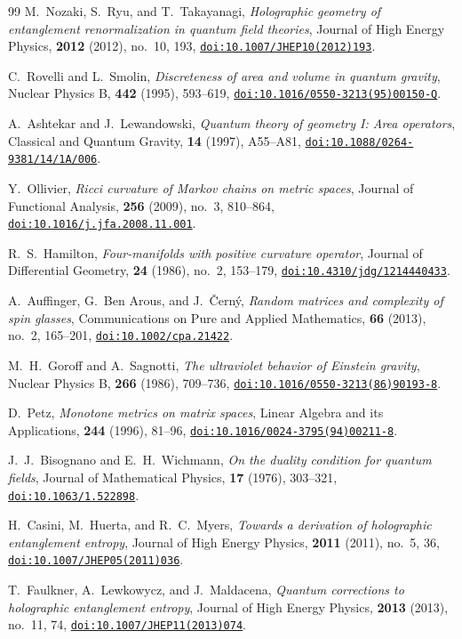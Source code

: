 \documentclass[11pt,a4paper,reqno]{amsart}
\theoremstyle{definition}
\numberwithin{equation}{section}
\providecommand{\doi}[1]{\href{https://doi.org/#1}{\nolinkurl{doi:#1}}}
\begin{document}
\begin{thebibliography}{99}
M.~Nozaki, S.~Ryu, and T.~Takayanagi,
\emph{Holographic geometry of entanglement renormalization in quantum field theories},
Journal of High Energy Physics, \textbf{2012} (2012), no.~10, 193,
\doi{10.1007/JHEP10(2012)193}.

C.~Rovelli and L.~Smolin,
\emph{Discreteness of area and volume in quantum gravity},
Nuclear Physics B, \textbf{442} (1995), 593--619,
\doi{10.1016/0550-3213(95)00150-Q}.

A.~Ashtekar and J.~Lewandowski,
\emph{Quantum theory of geometry I: Area operators},
Classical and Quantum Gravity, \textbf{14} (1997), A55--A81,
\doi{10.1088/0264-9381/14/1A/006}.

Y.~Ollivier,
\emph{Ricci curvature of Markov chains on metric spaces},
Journal of Functional Analysis, \textbf{256} (2009), no.~3, 810--864,
\doi{10.1016/j.jfa.2008.11.001}.

R.~S.~Hamilton,
\emph{Four-manifolds with positive curvature operator},
Journal of Differential Geometry, \textbf{24} (1986), no.~2, 153--179,
\doi{10.4310/jdg/1214440433}.

A.~Auffinger, G.~Ben Arous, and J.~{\v{C}}ern{\'y},
\emph{Random matrices and complexity of spin glasses},
Communications on Pure and Applied Mathematics, \textbf{66} (2013), no.~2, 165--201,
\doi{10.1002/cpa.21422}.

M.~H.~Goroff and A.~Sagnotti,
\emph{The ultraviolet behavior of Einstein gravity},
Nuclear Physics B, \textbf{266} (1986), 709--736,
\doi{10.1016/0550-3213(86)90193-8}.

D.~Petz,
\emph{Monotone metrics on matrix spaces},
Linear Algebra and its Applications, \textbf{244} (1996), 81--96,
\doi{10.1016/0024-3795(94)00211-8}.

J.~J.~Bisognano and E.~H.~Wichmann,
\emph{On the duality condition for quantum fields},
Journal of Mathematical Physics, \textbf{17} (1976), 303--321,
\doi{10.1063/1.522898}.

H.~Casini, M.~Huerta, and R.~C.~Myers,
\emph{Towards a derivation of holographic entanglement entropy},
Journal of High Energy Physics, \textbf{2011} (2011), no.~5, 36,
\doi{10.1007/JHEP05(2011)036}.

T.~Faulkner, A.~Lewkowycz, and J.~Maldacena,
\emph{Quantum corrections to holographic entanglement entropy},
Journal of High Energy Physics, \textbf{2013} (2013), no.~11, 74,
\doi{10.1007/JHEP11(2013)074}.


\end{thebibliography}
\end{document}
